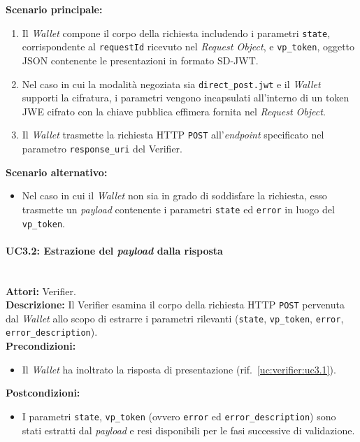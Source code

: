 \noindent\textbf{Scenario principale:}
\begin{enumerate}
    \item Il \textit{Wallet} compone il corpo della richiesta includendo i parametri \texttt{state}, corrispondente al \texttt{requestId} ricevuto nel \textit{Request Object}, e \texttt{vp\_\allowbreak{}token}, oggetto JSON contenente le presentazioni in formato SD-JWT.
    \item Nel caso in cui la modalità negoziata sia \texttt{direct\_\allowbreak{}post.jwt} e il \textit{Wallet} supporti la cifratura, i parametri vengono incapsulati all'interno di un token JWE cifrato con la chiave pubblica effimera fornita nel \textit{Request Object}.
    \item Il \textit{Wallet} trasmette la richiesta HTTP \texttt{POST} all'\textit{endpoint} specificato nel parametro \texttt{response\_\allowbreak{}uri} del Verifier.
\end{enumerate}

\noindent\textbf{Scenario alternativo:}
\begin{itemize}
    \item Nel caso in cui il \textit{Wallet} non sia in grado di soddisfare la richiesta, esso trasmette un \textit{payload} contenente i parametri \texttt{state} ed \texttt{error} in luogo del \texttt{vp\_\allowbreak{}token}.
\end{itemize}

\paragraph{\large\bfseries UC3.2: Estrazione del \textit{payload} dalla risposta}
\label{uc:verifier:uc3.2}
\mbox{}\\
\noindent\textbf{Attori:} Verifier.
\\
\noindent\textbf{Descrizione:} Il Verifier esamina il corpo della richiesta HTTP \texttt{POST} pervenuta dal \textit{Wallet} allo scopo di estrarre i parametri rilevanti (\texttt{state}, \texttt{vp\_\allowbreak{}token}, \texttt{error}, \texttt{error\_\allowbreak{}description}).
\\
\noindent\textbf{Precondizioni:}
\begin{itemize}
    \item Il \textit{Wallet} ha inoltrato la risposta di presentazione (rif.\ \ref{uc:verifier:uc3.1}).
\end{itemize}
\noindent\textbf{Postcondizioni:}
\begin{itemize}
    \item I parametri \texttt{state}, \texttt{vp\_\allowbreak{}token} (ovvero \texttt{error} ed \texttt{error\_\allowbreak{}description}) sono stati estratti dal \textit{payload} e resi disponibili per le fasi successive di validazione.
\end{itemize}

